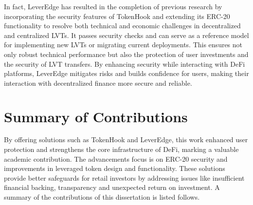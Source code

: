 In fact, LeverEdge has resulted in the completion of previous research by incorporating the security features of TokenHook and extending its ERC-20 functionality to resolve both technical and economic challenges in decentralized and centralized LVTs. It passes security checks and can serve as a reference model for implementing new LVTs or migrating current deployments. This ensures not only robust technical performance but also the protection of user investments and the security of LVT transfers. By enhancing security while interacting with DeFi platforms, LeverEdge mitigates risks and builds confidence for users, making their interaction with decentralized finance more secure and reliable.

\section{Summary of Contributions}\label{sec:summary}
By offering solutions such as TokenHook and LeverEdge, this work enhanced user protection and strengthens the core infrastructure of DeFi, marking a valuable academic contribution. The advancements focus is on ERC-20 security and improvements in leveraged token design and functionality. These solutions provide better safeguards for retail investors by addressing issues like insufficient financial backing, transparency and unexpected return on investment. A summary of the contributions of this dissertation is listed follows.
